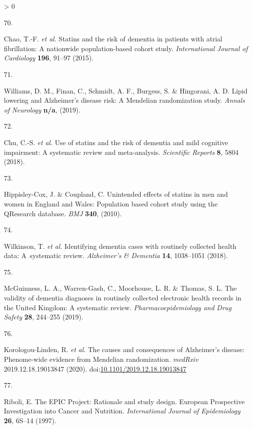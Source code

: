 \documentclass[a4paper, twoside]{templates/ociamthesis}
\newlength{\cslhangindent}
\newlength{\csllabelwidth}
\newenvironment{CSLReferences}[3] %
 {%
  \setlength{\parindent}{0pt}
  \ifodd #1 \everypar{\setlength{\hangindent}{\cslhangindent}}\ignorespaces\fi
  \ifnum #2 > 0
  \setlength{\parskip}{#2\baselineskip}
  \fi
 }%
 {}
\newcommand{\CSLLeftMargin}[1]{\parbox[t]{\maxof{\widthof{#1}}{\csllabelwidth}}{#1}}
\newcommand{\CSLRightInline}[1]{\parbox[t]{\linewidth - \csllabelwidth}{#1}}
\begin{document}
\begin{CSLReferences}{0}{0}
\leavevmode\hypertarget{ref-chao2015}{}%
\CSLLeftMargin{70. }
\CSLRightInline{Chao, T.-F. \emph{et al.} Statins and the risk of dementia in patients with atrial fibrillation: {A} nationwide population-based cohort study. \emph{International Journal of Cardiology} \textbf{196}, 91--97 (2015).}

\leavevmode\hypertarget{ref-williams}{}%
\CSLLeftMargin{71. }
\CSLRightInline{Williams, D. M., Finan, C., Schmidt, A. F., Burgess, S. \& Hingorani, A. D. Lipid lowering and {Alzheimer}'s disease risk: A {Mendelian} randomization study. \emph{Annals of Neurology} \textbf{n/a}, (2019).}

\leavevmode\hypertarget{ref-chu2018}{}%
\CSLLeftMargin{72. }
\CSLRightInline{Chu, C.-S. \emph{et al.} Use of statins and the risk of dementia and mild cognitive impairment: {A} systematic review and meta-analysis. \emph{Scientific Reports} \textbf{8}, 5804 (2018).}

\leavevmode\hypertarget{ref-hippisley-cox2010}{}%
\CSLLeftMargin{73. }
\CSLRightInline{Hippisley-Cox, J. \& Coupland, C. Unintended effects of statins in men and women in {England} and {Wales}: Population based cohort study using the {QResearch} database. \emph{BMJ} \textbf{340}, (2010).}

\leavevmode\hypertarget{ref-wilkinson2018}{}%
\CSLLeftMargin{74. }
\CSLRightInline{Wilkinson, T. \emph{et al.} Identifying dementia cases with routinely collected health data: {A}~systematic review. \emph{Alzheimer's \& Dementia} \textbf{14}, 1038--1051 (2018).}

\leavevmode\hypertarget{ref-mcguinness2019b}{}%
\CSLLeftMargin{75. }
\CSLRightInline{McGuinness, L. A., Warren-Gash, C., Moorhouse, L. R. \& Thomas, S. L. The validity of dementia diagnoses in routinely collected electronic health records in the {United Kingdom}: {A} systematic review. \emph{Pharmacoepidemiology and Drug Safety} \textbf{28}, 244--255 (2019).}

\leavevmode\hypertarget{ref-korologou-linden2020}{}%
\CSLLeftMargin{76. }
\CSLRightInline{Korologou-Linden, R. \emph{et al.} The causes and consequences of {Alzheimer}'s disease: Phenome-wide evidence from {Mendelian} randomization. \emph{medRxiv} 2019.12.18.19013847 (2020). doi:\href{https://doi.org/10.1101/2019.12.18.19013847}{10.1101/2019.12.18.19013847}}

\leavevmode\hypertarget{ref-riboli1997}{}%
\CSLLeftMargin{77. }
\CSLRightInline{Riboli, E. The {EPIC Project}: Rationale and study design. {European Prospective Investigation} into {Cancer} and {Nutrition}. \emph{International Journal of Epidemiology} \textbf{26}, 6S--14 (1997).}


\end{CSLReferences}
\end{document}
